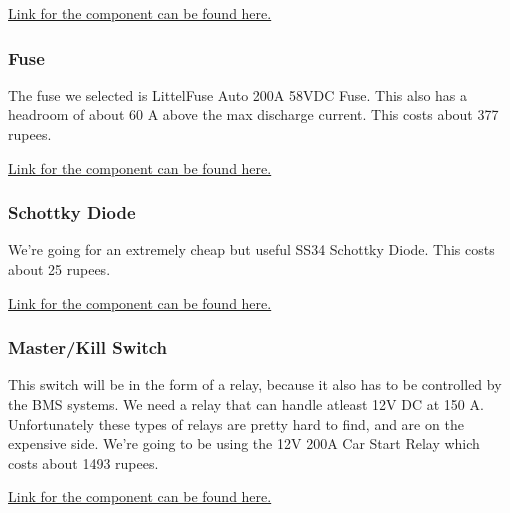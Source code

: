 \documentclass[12pt]{article}
\begin{document}
\href{https://robu.in/product/pro-range-5200mah-3s-40c80c-lithium-polymer-battery-pack-lipo/}{Link for the component can be found here.}


\subsubsection*{Fuse}
The fuse we selected is LittelFuse Auto 200A 58VDC Fuse. This also has a headroom of about 60 A above the max discharge current. This costs about 377 rupees.

\href{https://www.digikey.in/en/products/detail/littelfuse-inc/142.5631.6202/2515909?gad_source=1&gad_campaignid=20498599563&gbraid=0AAAAADrbLljJD7EDQKu9e9nLQij0boGQ3&gclid=CjwKCAjw_pDBBhBMEiwAmY02NlW6MqK-9fe1ue4tsHIFhOGmYJwIuewU8G1YjnB5rM2lacEHPa4Z9hoCnioQAvD_BwE&gclsrc=aw.ds}{Link for the component can be found here.}

\subsubsection*{Schottky Diode}
We're going for an extremely cheap but useful SS34 Schottky Diode. This costs about 25 rupees.

\href{https://robu.in/product/ss34-schottky-diode-for-high-speed-switching-pack-of-2/?gad_source=1&gad_campaignid=17427802703&gbraid=0AAAAADvLFWebM7-G2QsFY7UCdjSACyQJK&gclid=CjwKCAjw_pDBBhBMEiwAmY02Ng7v65L4U7x7HYcmHqhfgriCHJnP5DWrVZJornA1QMzXB2dP9AnKdRoC5OUQAvD_BwE}{Link for the component can be found here.}

\subsubsection*{Master/Kill Switch}
This switch will be in the form of a relay, because it also has to be controlled by the BMS systems. We need a relay that can handle atleast 12V DC at 150 A. Unfortunately these types of relays are pretty hard to find, and are on the expensive side.
\newline
We're going to be using the 12V 200A Car Start Relay which costs about 1493 rupees.

\href{https://order2india.com/products/12v-200a-car-start-relay-with-accessories?variant=43710190583930&utm_source=google&utm_medium=organic&utm_campaign=ALL&utm_content=12V\%20200A\%20Car\%20Start\%20Relay\%20with\%20Accessories&gad_source=1&gad_campaignid=21058867647&gbraid=0AAAAADjpDzQd_h_QiVlT-siNAMC-BX8IV&gclid=CjwKCAjw_pDBBhBMEiwAmY02NoSwFztjR-UFZ8ERJ-SUvc4wo6-MO1Tyu-ZFE0xYVFXtt13ZgQBkBhoCj_MQAvD_BwE}{Link for the component can be found here.}
\end{document}
